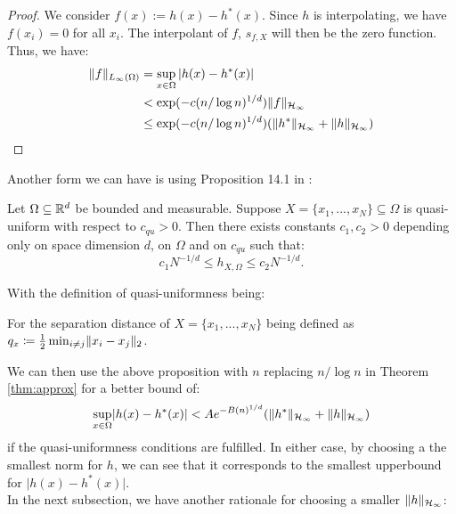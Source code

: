 \documentclass[twoside]{memoir}
\begin{document}
\begin{proof}
We consider $f(x) := h(x) - h^*(x)$. Since $h$ is interpolating, we have $f(x_i) = 0$ for all $x_i$. The interpolant of $f$, $s_{f,X}$ will then be the zero function. Thus, we have:
\begin{equation*}
\begin{split}
\lVert f\rVert_{L_\infty(\Omega)} &= \sup_{x \in \Omega} \vert h(x) - h^*(x)\vert \\
&< \exp(-c(n/\log n)^{1/d})\lVert f\rVert_{\mathcal{H}_\infty} \\
&\leq \exp(-c(n/\log n)^{1/d}) (\lVert h^*\rVert_{\mathcal{H}_\infty} + \lVert h\rVert_{\mathcal{H}_\infty})
\end{split}
\end{equation*}
\end{proof}
Another form we can have is using Proposition 14.1 in \cite{ScatteredDataApproximation}:
\begin{prop}
	Let $\Omega \subseteq \mathbb{R}^d$ be bounded and measurable. Suppose $X = \{x_1, ... , x_N\} \subseteq \Omega$ is quasi-uniform with respect to  $c_{qu} > 0$. Then there exists constants $c_1, c_2 > 0$ depending only on space dimension $d$, on $\Omega$ and on $c_{qu}$ such that:
	\[c_1N^{-1/d} \leq h_{X,\Omega} \leq c_2N^{-1/d}. \]
\end{prop}
With the definition of quasi-uniformness being:
\begin{defn}
	For the separation distance of $X = \{x_1, ... , x_N\}$ being defined as $q_x \coloneqq \frac{1}{2} \min_{i\neq j} \lVert x_i - x_j\rVert_2$.
\end{defn}
We can then use the above proposition with $n$ replacing $n/\log n$ in Theorem \ref{thm:approx} for a better bound of:
\[ \sup_{x \in \Omega} \lvert h(x) - h^*(x)\rvert < A e^{-B(n)^{1/d}} (\lVert h^*\rVert_{\mathcal{H}_\infty} + \lVert h\rVert_{\mathcal{H}_\infty}) \]
if the quasi-uniformness conditions are fulfilled.
In either case, by choosing a the smallest norm for $h$, we can see that it corresponds to the smallest upperbound for $\vert h(x) - h^*(x)\vert$. \\
In the next subsection, we have another rationale for choosing a smaller $\lVert h\rVert_{\mathcal{H}_\infty}$:
\end{document}

